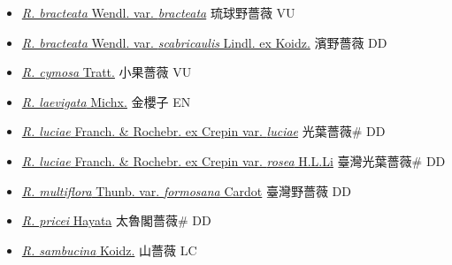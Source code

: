 \begin{itemize}
  \begin{itemize}
        \item[] \href{http://www.theplantlist.org/tpl1.1/search?q=Rosa+bracteata+var.+bracteata}{\textit{R. bracteata} Wendl. var. \textit{bracteata}}   琉球野薔薇 VU
        \item[] \href{http://www.theplantlist.org/tpl1.1/search?q=Rosa+bracteata+var.+scabricaulis}{\textit{R. bracteata} Wendl. var. \textit{scabricaulis} Lindl. ex Koidz.}   濱野薔薇 DD
        \item[] \href{http://www.theplantlist.org/tpl1.1/search?q=Rosa+cymosa}{\textit{R. cymosa} Tratt.}   小果薔薇 VU
        \item[] \href{http://www.theplantlist.org/tpl1.1/search?q=Rosa+laevigata}{\textit{R. laevigata} Michx.}   金櫻子 EN
        \item[] \href{http://www.theplantlist.org/tpl1.1/search?q=Rosa+luciae+var.+luciae}{\textit{R. luciae} Franch. \& Rochebr. ex Crepin var. \textit{luciae}}   光葉薔薇\# DD
        \item[] \href{http://www.theplantlist.org/tpl1.1/search?q=Rosa+luciae+var.+rosea}{\textit{R. luciae} Franch. \& Rochebr. ex Crepin var. \textit{rosea} H.L.Li}   臺灣光葉薔薇\# DD
        \item[] \href{http://www.theplantlist.org/tpl1.1/search?q=Rosa+multiflora+var.+formosana}{\textit{R. multiflora} Thunb. var. \textit{formosana} Cardot}   臺灣野薔薇 DD
        \item[] \href{http://www.theplantlist.org/tpl1.1/search?q=Rosa+pricei}{\textit{R. pricei} Hayata}   太魯閣薔薇\# DD
        \item[] \href{http://www.theplantlist.org/tpl1.1/search?q=Rosa+sambucina}{\textit{R. sambucina} Koidz.}   山薔薇 LC

\end{itemize}
\end{itemize}
